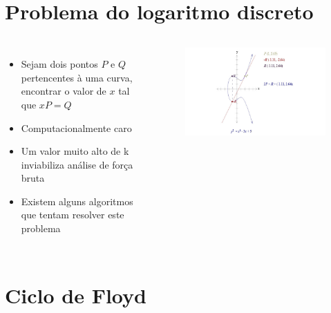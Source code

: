 \documentclass{beamer}
\begin{document}
\section{Problema do logaritmo discreto}
\begin{frame}
\begin{columns}[c]
\begin{itemize}
\item Sejam dois pontos $P$ e $Q$ pertencentes à uma curva, encontrar o valor de $x$ tal que $xP = Q$
\item Computacionalmente caro
\item Um valor muito alto de k inviabiliza análise de força bruta
\item Existem alguns algoritmos que tentam resolver este problema
\end{itemize}

\begin{figure}
\includegraphics[scale=0.3]{multiplicacao_ponto}
\end{figure}
\end{columns}
\end{frame}

%
%

\section{Ciclo de Floyd}
\begin{frame}

\end{frame}
\end{document}
